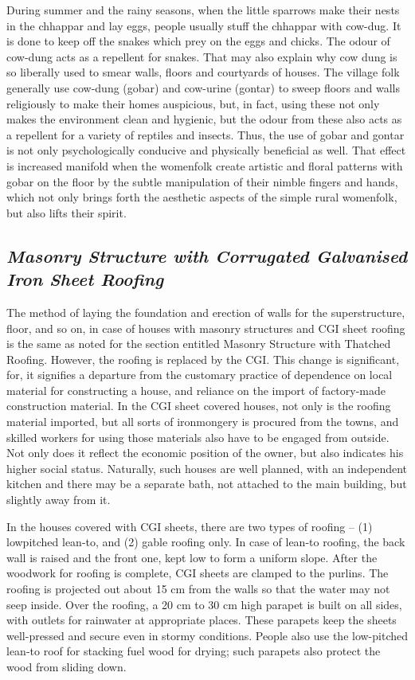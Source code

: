During summer and the rainy seasons, when the little sparrows make their nests in the chhappar and lay eggs, people usually stuff the chhappar with cow-dug. It is done to keep off the snakes which prey on the eggs and chicks. The odour of cow-dung acts as a repellent for snakes. That may also explain why cow dung is so liberally used to smear walls, floors and courtyards of houses. The village folk generally use cow-dung (gobar) and cow-urine (gontar) to sweep floors and walls religiously to make their homes auspicious, but, in fact, using these not only makes the environment clean and hygienic, but the odour from these also acts as a repellent for a variety of reptiles and insects. Thus, the use of gobar and gontar is not only psychologically conducive and physically beneficial as well. That effect is increased manifold when the womenfolk create artistic and floral patterns with gobar on the floor by the subtle manipulation of their nimble fingers and hands, which not only brings forth the aesthetic aspects of the simple rural womenfolk, but also lifts their spirit.


\subsection*{\textit{Masonry Structure with Corrugated Galvanised Iron Sheet Roofing}}

The method of laying the foundation and erection of walls for the superstructure, floor, and so on, in case of houses with masonry structures and CGI sheet roofing is the same as noted for the section entitled Masonry Structure with Thatched Roofing. However, the roofing is replaced by the CGI. This change is significant, for, it signifies a departure from the customary practice of dependence on local material for constructing a house, and reliance on the import of factory-made construction material. In the CGI sheet covered houses, not only is the roofing material imported, but all sorts of ironmongery is procured from the towns, and skilled workers for using those materials also have to be engaged from outside. Not only does it reflect the economic position of the owner, but also indicates his higher social status. Naturally, such houses are well planned, with an independent kitchen and there may be a separate bath, not attached to the main building, but slightly away from it.

In the houses covered with CGI sheets, there are two types of roofing – (1) lowpitched lean-to, and (2) gable roofing only. In case of lean-to roofing, the back wall is raised and the front one, kept low to form a uniform slope. After the woodwork for roofing is complete, CGI sheets are clamped to the purlins. The roofing is projected out about 15 cm from the walls so that the water may not seep inside. Over the roofing, a 20 cm to 30 cm high parapet is built on all sides, with outlets for rainwater at appropriate places. These parapets keep the sheets well-pressed and secure even in stormy conditions. People also use the low-pitched lean-to roof for stacking fuel wood for drying; such parapets also protect the wood from sliding down.

